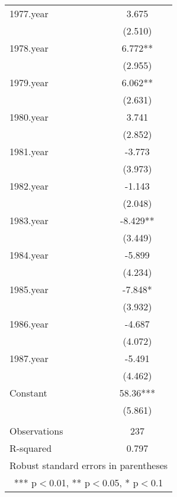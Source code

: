 \begin{tabular}{lc}
1977.year & 3.675 \\
 & (2.510) \\
1978.year & 6.772** \\
 & (2.955) \\
1979.year & 6.062** \\
 & (2.631) \\
1980.year & 3.741 \\
 & (2.852) \\
1981.year & -3.773 \\
 & (3.973) \\
1982.year & -1.143 \\
 & (2.048) \\
1983.year & -8.429** \\
 & (3.449) \\
1984.year & -5.899 \\
 & (4.234) \\
1985.year & -7.848* \\
 & (3.932) \\
1986.year & -4.687 \\
 & (4.072) \\
1987.year & -5.491 \\
 & (4.462) \\
Constant & 58.36*** \\
 & (5.861) \\
 &  \\
Observations & 237 \\
 R-squared & 0.797 \\ \hline
\multicolumn{2}{c}{ Robust standard errors in parentheses} \\
\multicolumn{2}{c}{ *** p$<$0.01, ** p$<$0.05, * p$<$0.1} \\
\end{tabular}
